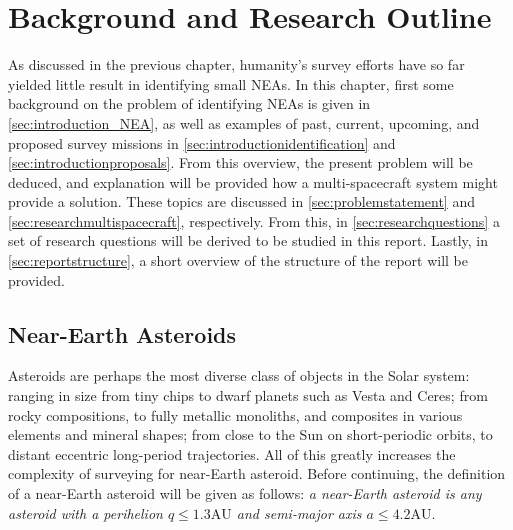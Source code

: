 \chapter{Background and Research Outline}
As discussed in the previous chapter, humanity's survey efforts have so far yielded little result in identifying small NEAs. In this chapter, first some background on the problem of identifying NEAs is given in \autoref{sec:introduction_NEA}, as well as examples of past, current, upcoming, and proposed survey missions in \autoref{sec:introductionidentification} and \autoref{sec:introductionproposals}. From this overview, the present problem will be deduced, and explanation will be provided how a multi-spacecraft system might provide a solution. These topics are discussed in \autoref{sec:problemstatement} and \autoref{sec:researchmultispacecraft}, respectively. From this, in \autoref{sec:researchquestions} a set of research questions will be derived to be studied in this report. Lastly, in \autoref{sec:reportstructure}, a short overview of the structure of the report will be provided.

\section{Near-Earth Asteroids}
\label{sec:introduction_NEA}
Asteroids are perhaps the most diverse class of objects in the Solar system: ranging in size from tiny chips to dwarf planets such as Vesta and Ceres; from rocky compositions, to fully metallic monoliths, and composites in various elements and mineral shapes; from close to the Sun on short-periodic orbits, to distant eccentric long-period trajectories. All of this greatly increases the complexity of surveying for near-Earth asteroid. Before continuing, the definition of a near-Earth asteroid will be given as follows: \textit{a near-Earth asteroid is any asteroid with a perihelion $q \leq 1.3 \mathrm{AU}$ and semi-major axis $a \leq 4.2 \mathrm{AU}$}. \\

